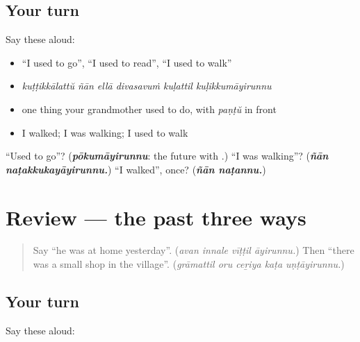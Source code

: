 \subsection*{Your turn}
Say these aloud:

\begin{itemize}
\raggedright
  \item \textquotedblleft{}I used to go\textquotedblright{}, \textquotedblleft{}I used to read\textquotedblright{}, \textquotedblleft{}I used to walk\textquotedblright{}
  \item \emph{kuṭṭikkālattŭ ñān ellā divasavuṁ kuḷattil kuḷikkumāyirunnu}
  \item one thing your grandmother used to do, with \emph{paṇṭŭ} in front
  \item I walked; I was walking; I used to walk
\end{itemize}

\begin{tcolorbox}[breakable,colback=teal!4,colframe=teal!35!black,title={Before you move on}]
\textquotedblleft{}Used to go\textquotedblright{}? (\emph{\textbf{pōkumāyirunnu}}: the future \textbf{} with \textbf{}.) \textquotedblleft{}I was walking\textquotedblright{}? (\emph{\textbf{ñān naṭakkukayāyirunnu.}}) \textquotedblleft{}I walked\textquotedblright{}, once? (\emph{\textbf{ñān naṭannu.}})
\end{tcolorbox}
\section[(review)]{Review — the past three ways}

\label{lesson:ML-R339-the-past-three-ways}



\begin{quote}
Say \textquotedblleft{}he was at home yesterday\textquotedblright{}. (\emph{avan innale vīṭṭil āyirunnu.}) Then \textquotedblleft{}there was a small shop in the village\textquotedblright{}. (\emph{grāmattil oru ceṟiya kaṭa uṇṭāyirunnu.})
\end{quote}

\subsection*{Your turn}
Say these aloud:

